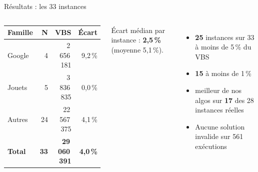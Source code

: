\documentclass[aspectratio=169,xcolor=table]{pres}
\begin{document}
\begin{frame}{Résultats : les 33 instances}   
  \begin{columns}[c]
    \centering
    \small
    \begin{tabular}{lrrr}
      \hline
      \rowcolor{accent!15} \textbf{Famille} & \textbf{N} & \textbf{VBS} & \textbf{Écart} \\ \hline
      Google   &  4 &  2\,656\,181 & 9,2\,\% \\ \hline
      Jouets   &  5 &  3\,836\,835 & 0,0\,\% \\ \hline
      Autres   & 24 & 22\,567\,375 & 4,1\,\% \\ \hline
      \rowcolor{accent!25} \textbf{Total} & \textbf{33} & \textbf{29\,060\,391} & \textbf{4,0\,\%} \\ \hline
    \end{tabular}

    \vspace{0.6em}
    {\footnotesize Écart médian par instance : \textbf{2,5\,\%} (moyenne 5,1\,\%).}

    \begin{itemize}
      \item \textbf{25} instances sur 33 à moins de 5\,\% du VBS
      \item \textbf{15} à moins de 1\,\%
      \item {} meilleur de nos algos sur \textbf{17} des 28 instances réelles
      \item Aucune solution invalide sur 561 exécutions
    \end{itemize}
  \end{columns}
\end{frame}
\end{document}
